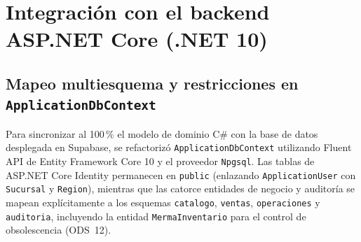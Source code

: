 
\section{Integraci\'on con el backend ASP.NET Core (.NET 10)}

\subsection{Mapeo multiesquema y restricciones en \texttt{ApplicationDbContext}}

Para sincronizar al 100\,\% el modelo de dominio C\# con la base de datos desplegada en Supabase, se refactoriz\'o \texttt{ApplicationDbContext} utilizando Fluent API de Entity Framework Core 10 y el proveedor \texttt{Npgsql}.
Las tablas de ASP.NET Core Identity permanecen en \texttt{public} (enlazando \texttt{ApplicationUser} con \texttt{Sucursal} y \texttt{Region}), mientras que las catorce entidades de negocio y auditor\'ia se mapean expl\'icitamente a los esquemas \texttt{catalogo}, \texttt{ventas}, \texttt{operaciones} y \texttt{auditoria}, incluyendo la entidad \texttt{MermaInventario} para el control de obsolescencia (ODS~12).


